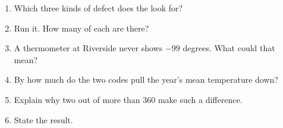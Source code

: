 \begin{problem}
\begin{enumerate}[resume]
  \item Which three kinds of defect does the  look for?
  \item Run it. How many of each are there?
  \item A thermometer at Riverside never shows $-99$ degrees. What could that
     mean?
  \item By how much do the two codes pull the year's mean temperature down?
  \item Explain why two  out of more than 360 make such a difference.
  \item State the result.
\end{enumerate}
\end{problem}
